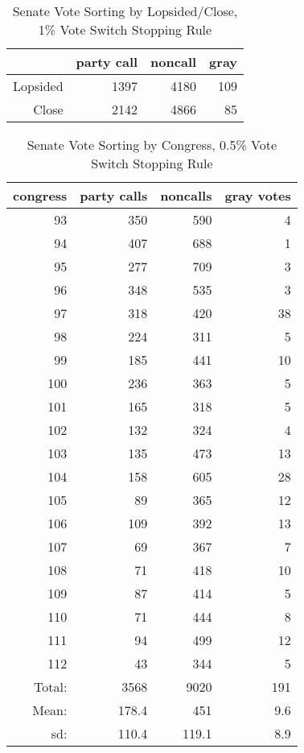 \documentclass[12pt]{article}
\begin{document}
\begin{table}[ht]
	\centering
	\caption{Senate Vote Sorting by Lopsided/Close, 1\% Vote Switch Stopping Rule}
	\begin{tabular}{rrrr}
		\hline
		& party call  & noncall & gray \\ 
		\hline
		Lopsided & 1397 & 4180 & 109 \\ 
		Close & 2142 & 4866 & 85 \\ 
		\hline
	\end{tabular}
\end{table}


\begin{table}[ht]
	\centering
	\caption{Senate Vote Sorting by Congress, 0.5\% Vote Switch Stopping Rule}
		\begin{tabular}{rrrr}
		\hline
		congress & party calls & noncalls & gray votes \\ 
		\hline
		93 & 350 & 590 &   4 \\ 
		94 & 407 & 688 &   1 \\ 
		95 & 277 & 709 &   3 \\ 
		96 & 348 & 535 &   3 \\ 
		97 & 318 & 420 &  38 \\ 
		98 & 224 & 311 &   5 \\ 
		99 & 185 & 441 &  10 \\ 
		100 & 236 & 363 &   5 \\ 
		101 & 165 & 318 &   5 \\ 
		102 & 132 & 324 &   4 \\ 
		103 & 135 & 473 &  13 \\ 
		104 & 158 & 605 &  28 \\ 
		105 &  89 & 365 &  12 \\ 
		106 & 109 & 392 &  13 \\ 
		107 &  69 & 367 &   7 \\ 
		108 &  71 & 418 &  10 \\ 
		109 &  87 & 414 &   5 \\ 
		110 &  71 & 444 &   8 \\ 
		111 &  94 & 499 &  12 \\ 
		112 &  43 & 344 &   5 \\ 
		\hline
		Total: & 3568 & 9020 & 191 \\
		Mean: & 178.4 & 451 & 9.6 \\
		sd: & 110.4 & 119.1 & 8.9 \\
		\hline
	\end{tabular}
\end{table}
\end{document}
